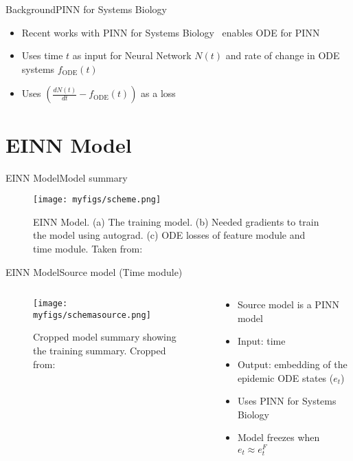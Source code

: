 \documentclass[
	aspectratio=169,	%
	onlytextwidth,		%
	t,					%
	]{beamer}
\begin{document}
\begin{frame}[fragile]{Background}{PINN for Systems Biology}

	\begin{itemize}

		\item Recent works with PINN for Systems Biology~\cite{yazdani, karnia} enables ODE for PINN 
		\item Uses time $t$ as input for Neural Network $N (t)$ and rate of change in ODE systems $f_{\text{ODE}} (t)$
		\item Uses $ (\frac{dN (t)}{dt}-f_{\text{ODE}} (t))$ as a loss
		
	\end{itemize}

\end{frame}

\section{EINN Model}

\begin{frame}[fragile]{EINN Model}{Model summary}

	\begin{figure}
		\texttt{[image: myfigs/scheme.png]}
		\caption{EINN Model. (a) The training model. (b) Needed gradients to train the model using autograd. (c) ODE losses of feature module and time module. Taken from:~\cite{main}}

	\end{figure}

\end{frame}

\begin{frame}[fragile]{EINN Model}{Source model (Time module)}
	\begin{columns}
		
		\begin{column}[T]{.5\textwidth}
			\begin{figure}
				\texttt{[image: myfigs/schemasource.png]}
				\caption{Cropped model summary showing the training summary. Cropped from:~\cite{main}}
			\end{figure}
		\end{column}
		
		\begin{column}[T]{.5\textwidth}
			\begin{itemize}
				\item<1-> Source model is a PINN model
				\item<2-> Input: time
				\item<3-> Output: embedding of the epidemic ODE states ($e_{t}$)
				\item <4-> Uses PINN for Systems Biology
				\item Model freezes when $e_{t} \approx e_{t}^{F}$
			\end{itemize}
		\end{column}
			
\end{columns}
\end{frame}
\end{document}
